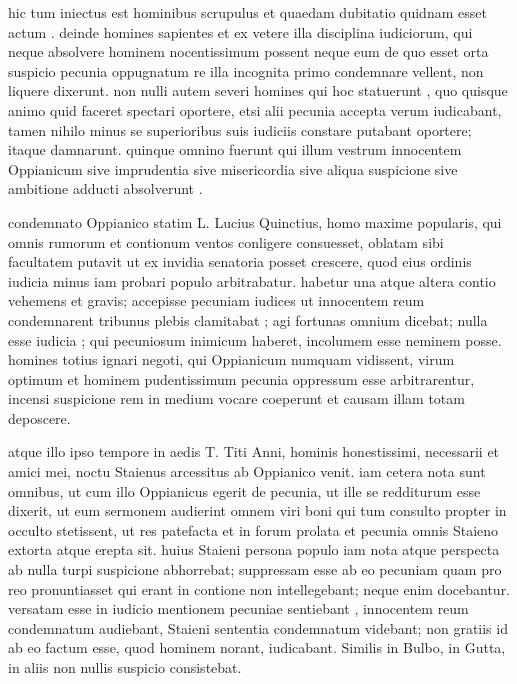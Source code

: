  hic tum iniectus est hominibus scrupulus et quaedam dubitatio quidnam esset actum . deinde homines sapientes et ex vetere illa disciplina iudiciorum, qui neque absolvere hominem nocentissimum possent neque eum de quo esset orta suspicio pecunia oppugnatum re illa incognita primo condemnare vellent, non liquere dixerunt. non nulli autem severi homines qui hoc statuerunt , quo quisque animo quid faceret spectari oportere, etsi alii pecunia accepta verum iudicabant, tamen nihilo minus se superioribus suis iudiciis constare putabant oportere; itaque damnarunt. quinque omnino fuerunt qui illum vestrum innocentem Oppianicum sive imprudentia sive misericordia sive aliqua suspicione sive ambitione adducti absolverunt .

 condemnato Oppianico statim L. Lucius Quinctius, homo maxime popularis, qui omnis rumorum et contionum ventos conligere consuesset, oblatam sibi facultatem putavit ut ex invidia senatoria posset crescere, quod eius ordinis iudicia minus iam probari populo arbitrabatur. habetur una atque altera contio vehemens et gravis; accepisse pecuniam iudices ut innocentem reum condemnarent tribunus plebis clamitabat ; agi fortunas omnium dicebat; nulla esse iudicia ; qui pecuniosum inimicum haberet, incolumem esse neminem posse. homines totius ignari negoti, qui Oppianicum numquam vidissent, virum optimum et hominem pudentissimum pecunia oppressum esse arbitrarentur, incensi suspicione rem in medium vocare coeperunt et causam illam totam deposcere.

 atque illo ipso tempore in aedis T. Titi Anni, hominis honestissimi, necessarii et amici mei, noctu Staienus arcessitus ab Oppianico venit. iam cetera nota sunt omnibus, ut cum illo Oppianicus egerit de pecunia, ut ille se redditurum esse dixerit, ut eum sermonem audierint omnem viri boni qui tum consulto propter in occulto stetissent, ut res patefacta et in forum prolata et pecunia omnis Staieno extorta atque erepta sit. huius Staieni persona populo iam nota atque perspecta ab nulla turpi suspicione abhorrebat; suppressam esse ab eo pecuniam quam pro reo pronuntiasset qui erant in contione non intellegebant; neque enim docebantur. versatam esse in iudicio mentionem pecuniae sentiebant , innocentem reum condemnatum audiebant, Staieni sententia condemnatum videbant; non gratiis id ab eo factum esse, quod hominem norant, iudicabant. Similis in Bulbo, in Gutta, in aliis non nullis suspicio consistebat.

